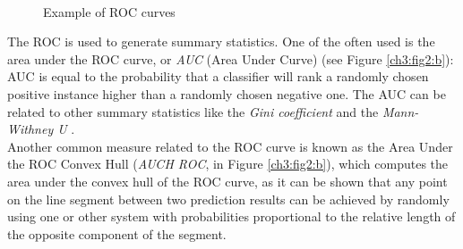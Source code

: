 \begin{figure}[!hbt]
  \centering
    \\
    \caption{Example of ROC curves}
    \label{ch3:fig2}
\end{figure}


The \Gls{ROC} is used to generate summary statistics. One of the often used is the area under the \Gls{ROC} curve, or \textit{AUC} (Area Under Curve) \cite{Brown200624, ROC02} (see Figure \ref{ch3:fig2:b}):
AUC is equal to the probability that a classifier will rank a randomly chosen positive instance higher than a randomly chosen negative one. The AUC can be related to other
summary statistics like the \textit{Gini coefficient} \cite{Gini} and the \textit{Mann-Withney U} \cite{MWU}.\\
Another common measure related to the \Gls{ROC} curve is known as the Area Under the ROC Convex Hull (\textit{AUCH ROC}, in Figure \ref{ch3:fig2:b}), which computes the area under the convex hull of the ROC curve, as
it can be shown that any point on the line segment between two prediction results can be achieved by randomly using one or other system with probabilities proportional to the relative length of the opposite component of the segment.

